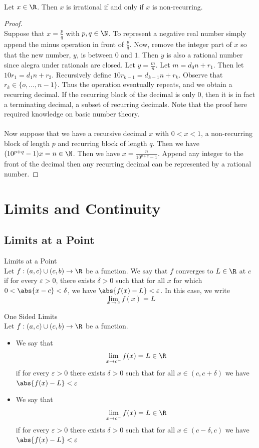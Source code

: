 \documentclass[a4paper]{article}
\begin{document}
\begin{prp}{}{}\\
Let $x\in\R$. Then $x$ is irrational if and only if $x$ is non-recurring. 
\begin{proof}\\
Suppose that $x=\frac{p}{q}$ with $p,q\in\N$. To represent a negative real number simply append the minus operation in front of $\frac{p}{q}$. Now, remove the integer part of $x$ so that the new number, $y$, is between $0$ and $1$. Then $y$ is also a rational number since alegra under rationals are closed. Let $y=\frac{m}{n}$. Let $m=d_0n+r_1$. Then let $10r_1=d_1n+r_2$. Recursively define $10r_{k-1}=d_{k-1}n+r_k$. Observe that $r_k\in\{o,\dots,n-1\}$. Thus the operation eventually repeats, and we obtain a recurring decimal. If the recurring block of the decimal is only $0$, then it is in fact a terminating decimal, a subset of recurring decimals. Note that the proof here required knowledge on basic number theory. \\~\\
Now suppose that we have a recursive decimal $x$ with $0<x<1$, a non-recurring block of length $p$ and recurring block of length $q$. Then we have $(10^{p+q}-1)x=n\in\N$. Then we have $x=\frac{n}{10^{p+q}-1}$. Append any integer to the front of the decimal then any recurring decimal can be represented by a rational number. 
\end{proof}
\end{prp}

\pagebreak
\section{Limits and Continuity}
\subsection{Limits at a Point}
\begin{defn}{Limits at a Point}{}\\
Let $f:(a,c)\cup(c,b)\to\R$ be a function. We say that $f$ converges to $L\in\R$ at $c$ if for every $\varepsilon>0$, there exists $\delta>0$ such that for all $x$ for which $0<\abs{x-c}<\delta$, we have $\abs{f(x)-L}<\varepsilon$. In this case, we write $$\lim_{x\to c}f(x)=L$$
\end{defn}

\begin{defn}{One Sided Limits}{}\\
Let $f:(a,c)\cup(c,b)\to\R$ be a function. 
\begin{itemize}
\item We say that $$\lim_{x\to c^+}f(x)=L\in\R$$ if for every $\varepsilon>0$ there exists $\delta>0$ such that for all $x\in(c,c+\delta)$ we have $\abs{f(x)-L}<\varepsilon$
\item We say that $$\lim_{x\to c^-}f(x)=L\in\R$$ if for every $\varepsilon>0$ there exists $\delta>0$ such that for all $x\in(c-\delta,c)$ we have $\abs{f(x)-L}<\varepsilon$
\end{itemize}
\end{defn}
\end{document}
